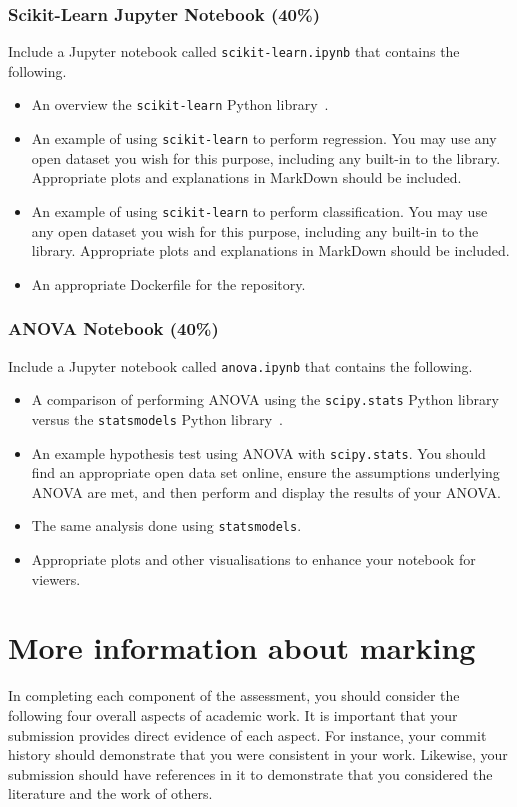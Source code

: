 \documentclass[a4paper, 12pt]{scrartcl}
\begin{document}
  \subsubsection*{Scikit-Learn Jupyter Notebook (40\%)}
  Include a Jupyter notebook called \texttt{scikit-learn.ipynb} that contains the following.
  \begin{itemize}
    \item An overview the \texttt{scikit-learn} Python library~\cite{scikit-learn}.
    \item An example of using \texttt{scikit-learn} to perform regression. You may use any open dataset you wish for this purpose, including any built-in to the library. Appropriate plots and explanations in MarkDown should be included.
    \item An example of using \texttt{scikit-learn} to perform classification. You may use any open dataset you wish for this purpose, including any built-in to the library. Appropriate plots and explanations in MarkDown should be included. 
    \item An appropriate Dockerfile for the repository.
  \end{itemize}
  
  \subsubsection*{ANOVA Notebook (40\%)}
  Include a Jupyter notebook called \texttt{anova.ipynb} that contains the following.
  \begin{itemize}
    \item A comparison of performing ANOVA using the \texttt{scipy.stats} Python library~\cite{scipy-stats} versus the \texttt{statsmodels} Python library~\cite{statsmodels}.
    \item An example hypothesis test using ANOVA with \texttt{scipy.stats}. You should find an appropriate open data set online, ensure the assumptions underlying ANOVA are met, and then perform and display the results of your ANOVA.
    \item The same analysis done using \texttt{statsmodels}.
    \item Appropriate plots and other visualisations to enhance your notebook for viewers.
  \end{itemize}

  \section*{More information about marking}
    In completing each component of the assessment, you should consider the following four overall aspects of academic work.
    It is important that your submission provides direct evidence of each aspect.
    For instance, your commit history should demonstrate that you were consistent in your work.
    Likewise, your submission should have references in it to demonstrate that you considered the literature and the work of others.
  
\end{document}

